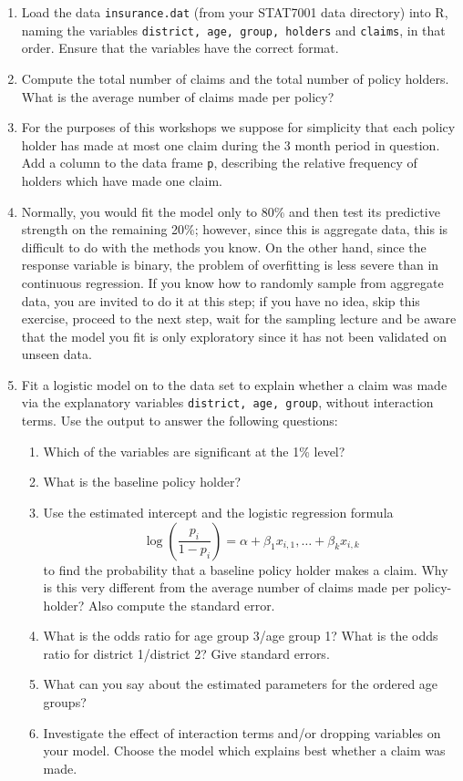 \begin{enumerate}
\item  Load the data {\tt insurance.dat} (from your STAT7001 data directory) into R, naming the variables {\tt district, age, group, holders} and {\tt claims}, in that order. Ensure that the variables have the correct format.

\item Compute the total number of claims and the total number of
policy holders. What is the average number of claims made per policy?

\item For the purposes of this workshops we suppose for simplicity that each policy holder has made at most one claim
during the 3 month period in question. Add a column to the data frame {\tt p}, describing the relative frequency of holders which have made one claim.

\item Normally, you would fit the model only to 80\% and then test its predictive strength on the remaining 20\%; however, since this is aggregate data, this is difficult to do with the methods you know. On the other hand, since the response variable is binary, the problem of overfitting is less severe than in continuous regression. If you know how to randomly sample from aggregate data, you are invited to do it at this step; if you have no idea, skip this exercise, proceed to the next step, wait for the sampling lecture and be aware that the model you fit is only exploratory since it has not been validated on unseen data.

\item Fit a logistic model on to the data set to explain whether a claim was made via the explanatory variables {\tt district, age, group}, without interaction terms. Use the output to answer the following questions:
    \begin{enumerate}
        \item Which of the variables are significant at the 1\% level?
        \item What is the baseline policy holder?
        \item Use the estimated intercept and the logistic regression formula
\[
\log \left(\frac{p_i}{1-p_i} \right) = \alpha +\beta _1 x_{i,1}, \dots +
\beta _k x_{i,k}
\]
to find the probability that a baseline policy holder makes a claim.
Why is this very different from the average number of claims made per
policy-holder? Also compute the standard error.
        \item What is the odds ratio for age group 3/age group 1? What is the odds ratio for district 1/district 2? Give standard errors.
        \item What can you say about the estimated parameters for the ordered age groups?
        \item Investigate the effect of interaction terms and/or dropping variables on your model. Choose the model which explains best whether a claim was made.
    \end{enumerate}


\end{enumerate}
